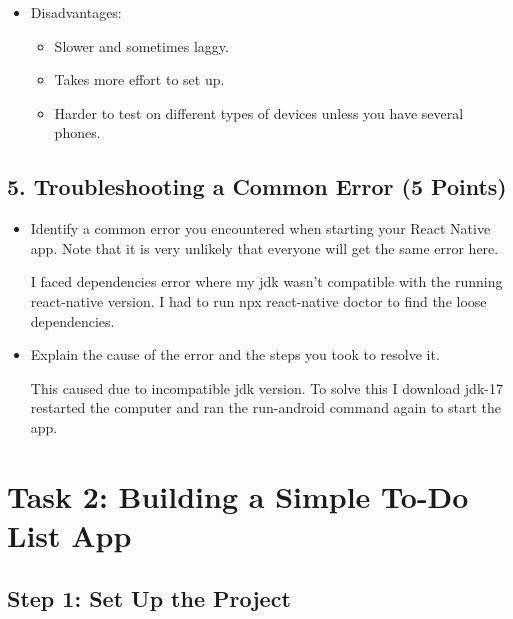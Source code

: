 \documentclass{article}
\begin{document}
\begin{itemize}
\begin{itemize}
\begin{itemize}
    \end{itemize}

    \item Disadvantages:

     \begin{itemize}
    
    \item Slower and sometimes laggy.
    \item Takes more effort to set up.
    \item Harder to test on different types of devices unless you have several phones.

    \end{itemize}

    \end{itemize}
    
\end{itemize}

\subsection*{5. Troubleshooting a Common Error (5 Points)}
\begin{itemize}
    \item Identify a common error you encountered when starting your React Native app. Note that it is very unlikely that everyone will get the same error here.

    I faced dependencies error where my jdk wasn't compatible with the running react-native version. I had to run npx react-native doctor to find the loose dependencies.

    \item Explain the cause of the error and the steps you took to resolve it.

    This caused due to incompatible jdk version. To solve this I download jdk-17 restarted the computer and ran the run-android command again to start the app.
    
\end{itemize}

\section*{Task 2: Building a Simple To-Do List App}

\subsection*{Step 1: Set Up the Project}
\end{document}
